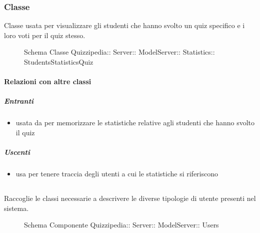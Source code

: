 \subsubsection{Classe }
Classe usata per visualizzare gli studenti che hanno svolto un quiz specifico e i loro voti per il quiz stesso.
\begin{figure}[H]
\centering
\noindent{}
\caption[Schema Classe StudentsStatisticsQuiz]{Schema Classe Quizzipedia:: Server:: ModelServer:: Statistics:: StudentsStatisticsQuiz}
\end{figure}
\paragraph{Relazioni con altre classi}
\subparagraph{Entranti}
\begin{itemize}
\item usata da  per memorizzare le statistiche relative agli studenti che hanno svolto il quiz
\end{itemize}
\subparagraph{Uscenti}
\begin{itemize}
\item usa  per tenere traccia degli utenti a cui le statistiche si riferiscono
\end{itemize}
\subsection{}
Raccoglie le classi necessarie a descrivere le diverse tipologie di utente presenti nel sistema.
\begin{figure}[H]
\centering
\noindent{}
\caption[Schema Componente Users]{Schema Componente Quizzipedia:: Server:: ModelServer:: Users}
\end{figure}
